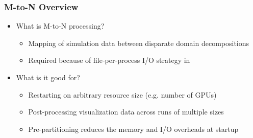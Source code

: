 \begin{frame}\frametitle{M-to-N Overview}
  \begin{itemize}
  \item What is M-to-N processing?
    \begin{itemize}
    \item Mapping of simulation data between disparate domain decompositions
    \item Required because of file-per-process I/O strategy in \mirgecom{}
    \end{itemize}
  \item What is it good for?
    \begin{itemize}
    \item Restarting \mirgecom{} on arbitrary resource size (e.g. number of GPUs)
    \item Post-processing visualization data across runs of multiple sizes
    \item Pre-partitioning reduces the memory and I/O overheads at \mirgecom{} startup
    \end{itemize}
  \end{itemize}
\end{frame}

